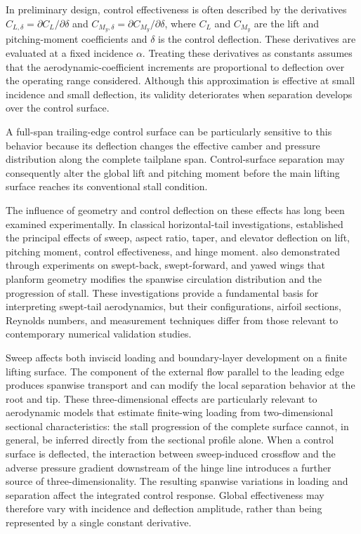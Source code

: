 \documentclass[journal ]{new-aiaa}
\begin{document}
In preliminary design, control effectiveness is often described by the derivatives \(C_{L,\delta}=\partial C_L/\partial\delta\) and \(C_{M_y,\delta}=\partial C_{M_y}/\partial\delta\), where \(C_L\) and \(C_{M_y}\) are the lift and pitching-moment coefficients and \(\delta\) is the control deflection. These derivatives are evaluated at a fixed incidence \(\alpha\).
Treating these derivatives as constants assumes that the aerodynamic-coefficient increments are proportional to deflection over the operating range considered.
Although this approximation is effective at small incidence and small deflection, its validity deteriorates when separation develops over the control surface.

A full-span trailing-edge control surface can be particularly sensitive to this behavior because its deflection changes the effective camber and pressure distribution along the complete tailplane span. 
Control-surface separation may consequently alter the global lift and pitching moment before the main lifting surface reaches its conventional stall condition.

The influence of geometry and control deflection on these effects has long been examined experimentally. In classical horizontal-tail investigations, \citet{Dods1948} established the principal effects of sweep, aspect ratio, taper, and elevator deflection on lift, pitching moment, control effectiveness, and hinge moment.
\citet{PurserSpearman1951} also demonstrated through experiments on swept-back, swept-forward, and yawed wings that planform geometry modifies the spanwise circulation distribution and the progression of stall.
These investigations provide a fundamental basis for interpreting swept-tail aerodynamics, but their configurations, airfoil sections, Reynolds numbers, and measurement techniques differ from those relevant to contemporary numerical validation studies.

Sweep affects both inviscid loading and boundary-layer development on a finite lifting surface. 
The component of the external flow parallel to the leading edge produces spanwise transport and can modify the local separation behavior at the root and tip. 
These three-dimensional effects are particularly relevant to aerodynamic models that estimate finite-wing loading from two-dimensional sectional characteristics: the stall progression of the complete surface cannot, in general, be inferred directly from the sectional profile alone.
When a control surface is deflected, the interaction between sweep-induced crossflow and the adverse pressure gradient downstream of the hinge line introduces a further source of three-dimensionality. 
The resulting spanwise variations in loading and separation affect the integrated control response. Global effectiveness may therefore vary with incidence and deflection amplitude, rather than being represented by a single constant derivative.
\end{document}
